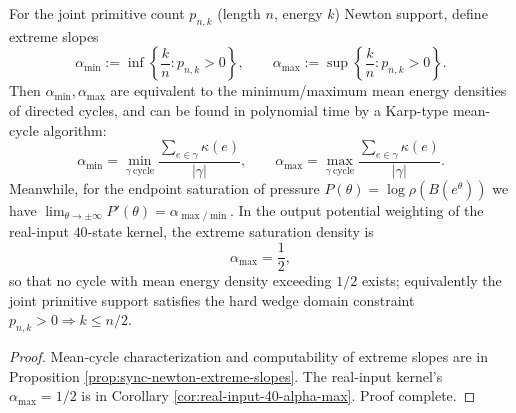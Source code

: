 \begin{conclusion}\label{con:xi-terminal-newton-extreme-slopes-alpha-half}
For the joint primitive count \(p_{n,k}\) (length \(n\), energy \(k\)) Newton support, define extreme slopes
\[
\alpha_{\min}:=\inf\left\{\frac{k}{n}:p_{n,k}>0\right\},\qquad
\alpha_{\max}:=\sup\left\{\frac{k}{n}:p_{n,k}>0\right\}.
\]
Then \(\alpha_{\min},\alpha_{\max}\) are equivalent to the minimum/maximum mean energy densities of directed cycles, and can be found in polynomial time by a Karp-type mean-cycle algorithm:
\[
\alpha_{\min}=\min_{\gamma\ \mathrm{cycle}}\frac{\sum_{e\in\gamma}\kappa(e)}{|\gamma|},\qquad
\alpha_{\max}=\max_{\gamma\ \mathrm{cycle}}\frac{\sum_{e\in\gamma}\kappa(e)}{|\gamma|}.
\]
Meanwhile, for the endpoint saturation of pressure \(P(\theta)=\log\rho(B(e^\theta))\) we have
\(
\lim_{\theta\to\pm\infty}P'(\theta)=\alpha_{\max/\min}
\).
In the output potential weighting of the real-input \(40\)-state kernel, the extreme saturation density is
\[
\alpha_{\max}=\frac12,
\]
so that no cycle with mean energy density exceeding \(1/2\) exists; equivalently the joint primitive support satisfies the hard wedge domain constraint \(p_{n,k}>0\Rightarrow k\le n/2\).
\end{conclusion}
\begin{proof}[Proof]
Mean-cycle characterization and computability of extreme slopes are in Proposition \ref{prop:sync-newton-extreme-slopes}.
The real-input kernel's \(\alpha_{\max}=1/2\) is in Corollary \ref{cor:real-input-40-alpha-max}. Proof complete.
\end{proof}

